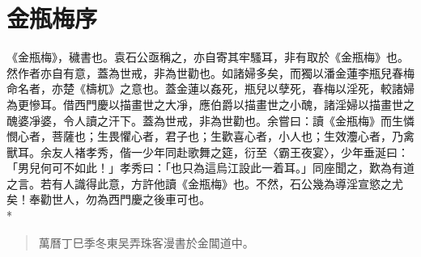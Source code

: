 \chapter*{金瓶梅序}


《金瓶梅》，穢書也。袁石公亟稱之，亦自寄其牢騷耳，非有取於《金瓶梅》也。然作者亦自有意，蓋為世戒，非為世勸也。如諸婦多矣，而獨以潘金蓮李瓶兒春梅命名者，亦楚《檮杌》之意也。蓋金蓮以姦死，瓶兒以孽死，春梅以淫死，較諸婦為更慘耳。借西門慶以描畫世之大凈，應伯爵以描畫世之小醜，諸淫婦以描畫世之醜婆凈婆，令人讀之汗下。蓋為世戒，非為世勸也。余嘗曰：讀《金瓶梅》而生憐憫心者，菩薩也；生畏懼心者，君子也；生歡喜心者，小人也；生效灋心者，乃禽獸耳。余友人褚孝秀，偕一少年同赴歌舞之筵，衍至〈霸王夜宴〉，少年垂涎曰：「男兒何可不如此！」孝秀曰：「也只為這烏江設此一着耳。」同座聞之，歎為有道之言。若有人識得此意，方許他讀《金瓶梅》也。不然，石公幾為導淫宣慾之尤矣！奉勸世人，勿為西門慶之後車可也。\\*

\begin{quotation}\begin{flushright}萬曆丁巳季冬東吴弄珠客漫書於金閶道中。\end{flushright}\end{quotation}

